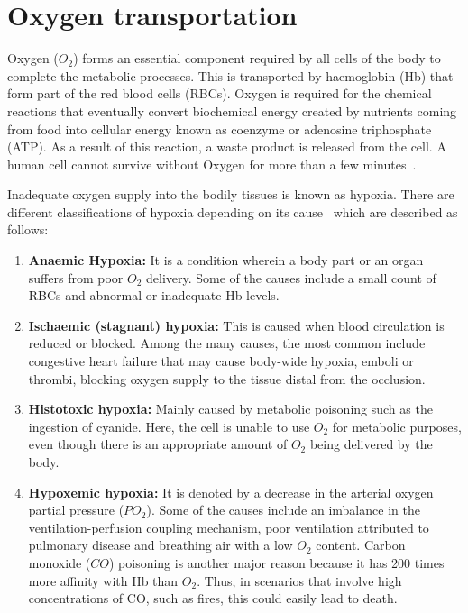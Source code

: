 \section{Oxygen transportation}
\label{section literature 1.2}
Oxygen ($O_2$) forms an essential component required by all cells of the body to complete the metabolic processes. This is transported by haemoglobin (Hb) that form part of the red blood cells (RBCs). Oxygen is required for the chemical reactions that eventually convert biochemical energy created by nutrients coming from food into cellular energy known as coenzyme or adenosine triphosphate (ATP). As a result of this reaction, a waste product is released from the cell. A human cell cannot survive without Oxygen for more than a few minutes~\cite{culmsee2005apoptosis}.

Inadequate oxygen supply into the bodily tissues is known as hypoxia. There are different classifications of hypoxia depending on its cause~\cite{marieb2007human} which are described as follows: 

\begin{enumerate}
	\item \textbf{Anaemic Hypoxia:} It is a condition wherein a body part or an organ suffers from poor $O_2$ delivery. Some of the causes include a small count of RBCs and abnormal or inadequate Hb levels.
	\item \textbf{Ischaemic (stagnant) hypoxia: }This is caused when blood circulation is reduced or blocked. Among the many causes, the most common include congestive heart failure that may cause body-wide hypoxia, emboli or thrombi, blocking oxygen supply to the tissue distal from the occlusion. 
	\item \textbf{Histotoxic hypoxia: }Mainly caused by metabolic poisoning such as the ingestion of cyanide. Here, the cell is unable to use $O_2$ for metabolic purposes, even though there is an appropriate amount of $O_2$ being delivered by the body.
	\item \textbf{Hypoxemic hypoxia:} It is denoted by a decrease in the arterial oxygen partial pressure ($PO_2$). Some of the causes include an imbalance in the ventilation-perfusion coupling mechanism, poor ventilation attributed to pulmonary disease and breathing air with a low $O_2$ content. Carbon monoxide ($CO$) poisoning is another major reason because it has \num{200} times more affinity with Hb than $O_2$. Thus, in scenarios that involve high concentrations of CO, such as fires, this could easily lead to death.
\end{enumerate}

